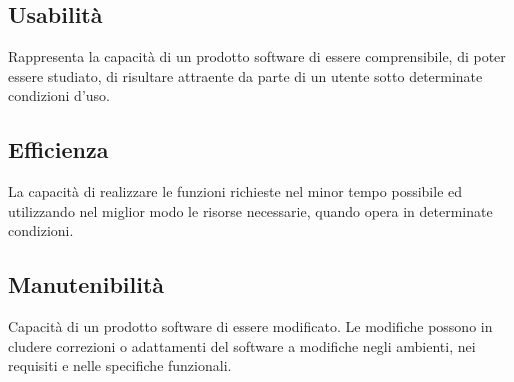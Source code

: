 \subsection{Usabilità}
Rappresenta la capacità di un prodotto software di essere comprensibile, di poter essere studiato, di risultare attraente da parte di un utente sotto determinate condizioni d'uso.
\def\productquality{
    {
        Qualità della messaggistica,
        $Q_{mex} = A_{clear}/B_{tot}$, 
        $Q_{mex} \geq 0.85$,
        $Q_{mex} = 1$
    },
    {
        Numero di click,
        $C_{click} = \#\ di\ click$,
        $C_{click} \leq 6$,
        $C_{click} \leq 4$,
        il task misurato è descritto nelle Norme di Progetto
    },
    {
        Site depth,
        $S_{depth} = td(G)$,
        $S_{depth} \leq 6$,
        $S_{depth} \leq 4$
    },
}


\subsection{Efficienza}
La capacità di realizzare le funzioni richieste nel minor tempo possibile ed utilizzando nel miglior modo le risorse necessarie, quando opera in determinate condizioni. 
\def\productquality{
    {
        Response time,
        $T_{response} = B_{end}-A_{start}$, 
        -,
        -,
        il task a cui fa riferimento la metrica è indicato nelle norme di progetto
    },
}




\subsection{Manutenibilità}
Capacità di un prodotto software di essere modificato. Le modifiche possono in cludere correzioni o adattamenti del software a modifiche negli ambienti, nei requisiti e nelle specifiche funzionali.
\def\productquality{
    {
        Complessità ciclomatica,
        $C_{cycl} = N_{err}/SLOC$, 
        -,
        -,
        è stato ritenuto prematuro definire valori sufficienti e ottimi per la metrica
    },
    {
        Indipendenza dei test,
        $I_{test} = A_{ind}/B_{tests}$,
        $I_{test} \geq 0.90$,
        $I_{test} = 0$
    },
    {
        Facilità di comprensione,
        $A_{comm}/SLOC$,
        -,
        -,
        non sono stati forniti valori sufficienti e ottimi in quanto ritenuto prematuro
    },
    {
        Sfin,
        $sfin(u) =  \sum u_{caller}$,
        $sfin(u) \geq 2$,
        $sfin(u) \geq 4$
    },
    {
        Sfout, 
        $sfout(u) = \sum u_{callee}$,
        $sfout(u) \leq 0$,
        $sfout(u) = 0$
    },
}
